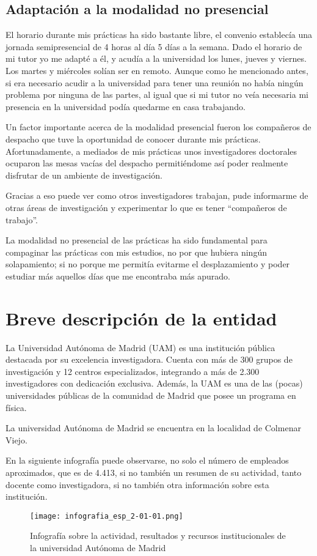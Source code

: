 \documentclass[12pt, a4paper]{article}
\theoremstyle{definition}
\begin{document}
\subsection{Adaptación a la modalidad no presencial}
El horario durante mis prácticas ha sido bastante libre, el convenio establecía una jornada semipresencial de 4 horas al día 5 días a la semana. Dado el horario de mi tutor yo me adapté a él, y acudía a la universidad los lunes, jueves y viernes. Los martes y miércoles solían ser en remoto. Aunque como he mencionado antes, si era necesario acudir a la universidad para tener una reunión no había ningún problema por ninguna de las partes, al igual que si mi tutor no veía necesaria mi presencia en la universidad podía quedarme en casa trabajando.

Un factor importante acerca de la modalidad presencial fueron los compañeros de despacho que tuve la oportunidad de conocer durante mis prácticas. Afortunadamente, a mediados de mis prácticas unos investigadores doctorales ocuparon las mesas vacías del despacho permitiéndome así poder realmente disfrutar de un ambiente de investigación.

Gracias a eso puede ver como otros investigadores trabajan, pude informarme de otras áreas de investigación y experimentar lo que es tener “compañeros de trabajo”.

La modalidad no presencial de las prácticas ha sido fundamental para compaginar las prácticas con mis estudios, no por que hubiera ningún solapamiento; si no porque me permitía evitarme el desplazamiento y poder estudiar más aquellos días que me encontraba más apurado.

\section{Breve descripción de la entidad}

La Universidad Autónoma de Madrid (UAM) es una institución pública destacada por su excelencia investigadora. Cuenta con más de 300 grupos de investigación y 12 centros especializados, integrando a más de 2.300 investigadores con dedicación exclusiva.
Además, la UAM es una de las (pocas) universidades públicas de la comunidad de Madrid que posee un programa en física.

La universidad Autónoma de Madrid se encuentra en la localidad de Colmenar Viejo.

En la siguiente infografía puede observarse, no solo el número de empleados aproximados, que es de 4.413, si no también un resumen de su actividad, tanto docente como investigadora, si no también otra información sobre esta institución.
\begin{figure}[H]
  \centering
  \texttt{[image: infografia\_esp\_2-01-01.png]}
  \caption{Infografía sobre la actividad, resultados y recursos institucionales de la universidad Autónoma de Madrid \autocite{UAMINF}}
  \label{fig:enter-label}
\end{figure}
\end{document}
